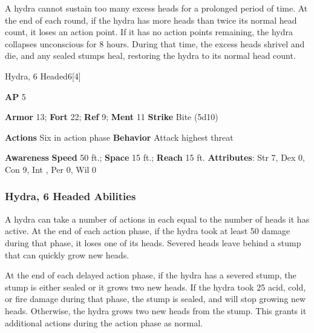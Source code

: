 A hydra cannot sustain too many excess heads for a prolonged period of time.
At the end of each round, if the hydra has more heads than twice its normal head count, it loses an action point.
If it has no action points remaining, the hydra collapses unconscious for 8 hours.
During that time, the excess heads shrivel and die, and any sealed stumps heal, restoring the hydra to its normal head count.

\begin{monsection}{Hydra, 6 Headed}{6}[4]
\vspace{-1em}\vspace{-1em}
\begin{spellcontent}
\begin{spelltargetinginfo}
{\textbf{AP} 5}

\pari \textbf{Armor} 13;
\textbf{Fort} 22;
\textbf{Ref} 9;
\textbf{Ment} 11
\pari \textbf{Strike} Bite  (5d10)


\pari \textbf{Actions} Six in action phase
\pari \textbf{Behavior} Attack highest threat
\end{spelltargetinginfo}
\end{spellcontent}

\begin{monsterfooter}
\pari \textbf{Awareness} 
\pari \textbf{Speed} 50 ft.;
\textbf{Space} 15 ft.;
\textbf{Reach} 15 ft.
\pari \textbf{Attributes}:
Str 7,
Dex 0,
Con 9,
Int ,
Per 0,
Wil 0
\end{monsterfooter}
\end{monsection}


\subsubsection{Hydra, 6 Headed Abilities}

A hydra can take a number of actions in each  equal to the number of heads it has active.
At the end of each action phase, if the hydra took at least 50 damage during that phase, it loses one of its heads.
Severed heads leave behind a stump that can quickly grow new heads.

At the end of each delayed action phase, if the hydra has a severed stump, the stump is either sealed or it grows two new heads.
If the hydra took 25 acid, cold, or fire damage during that phase, the stump is sealed, and will stop growing new heads.
Otherwise, the hydra grows two new heads from the stump.
This grants it additional actions during the action phase as normal.

